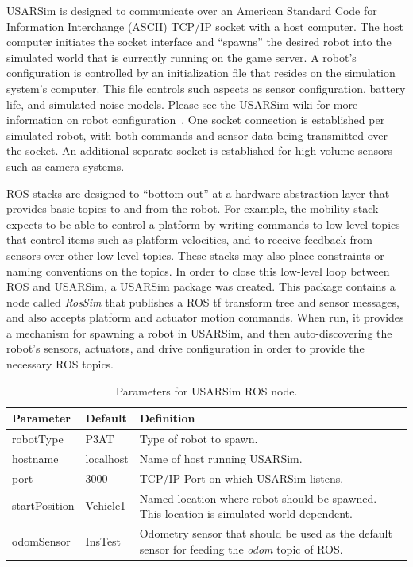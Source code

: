USARSim is designed to communicate over an American Standard Code for Information Interchange (ASCII) TCP/IP socket with a host computer. The host computer initiates the socket interface and ``spawns'' the desired robot into the simulated world that is currently running on the game server. A robot's configuration is controlled by an initialization file that resides on the simulation system's computer. This file controls such aspects as sensor configuration, battery life, and simulated noise models. Please see the USARSim wiki for more information on robot configuration~\cite{USARSimWeb}.  One socket connection is established per simulated robot, with both commands and sensor data being transmitted over the socket. An additional separate socket is established for high-volume sensors such as camera systems.

ROS stacks are designed to ``bottom out'' at a hardware abstraction layer that provides basic topics to and from the robot. For example, the mobility stack expects to be able to control a platform by writing commands to low-level topics that control items such as platform velocities, and to receive feedback from sensors over other low-level topics. These stacks may also place constraints or naming conventions on the topics.  In order to close this low-level loop between ROS and USARSim, a USARSim package was created. This package contains a node called {\it RosSim} that publishes a ROS tf transform tree and sensor messages, and also accepts platform and actuator motion commands. When run, it provides a mechanism for spawning a robot in USARSim, and then auto-discovering the robot's sensors, actuators, and drive configuration in order to provide the necessary ROS topics. 
 \begin{table}[t!]
    \begin{center}
    \small{
    \begin{tabular}{ | l | l | p{4cm} |}
    \hline
    Parameter & Default & Definition \\ \hline
   robotType & P3AT & Type of robot to spawn. \\ \hline
   hostname & localhost & Name of host running USARSim. \\ \hline
   port & 3000 & TCP/IP Port on which USARSim listens. \\ \hline
   startPosition & Vehicle1 & Named location where robot should be spawned. This location is simulated world dependent. \\ \hline
   odomSensor & InsTest & Odometry sensor that should be used as the default sensor for feeding the {\it odom} topic of ROS.\\ \hline
    \end{tabular}
   }
    \caption{Parameters for USARSim ROS node.}
    \label{Table:USARSimNode}
    \end{center}
\end{table}
